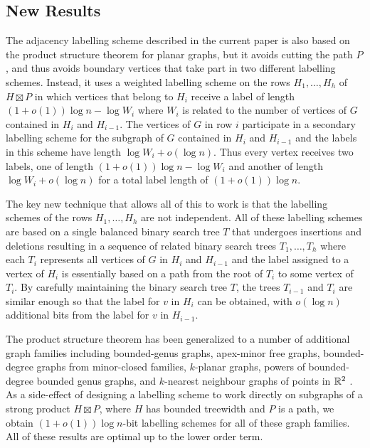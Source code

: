 \documentclass[kpfonts]{patmorin}
\begin{document}
\subsection{New Results}

The adjacency labelling scheme described in the current paper is also based on the product structure theorem for planar graphs, but it avoids cutting the path $P$, and thus avoids boundary vertices that take part in two different labelling schemes.  Instead, it uses a weighted labelling scheme on the rows $H_1,\dots,H_h$ of $H\boxtimes P$ in which vertices that belong to $H_i$ receive a label of length $(1+o(1))\log n-\log W_i$ where $W_i$ is related to the number of vertices of $G$ contained in $H_i$ and $H_{i-1}$.  The vertices of $G$ in row $i$ participate in a secondary labelling scheme for the subgraph of $G$ contained in $H_i$ and $H_{i-1}$ and the labels in this scheme have length $\log W_i + o(\log n)$. Thus every vertex receives two labels, one of length $(1+o(1))\log n-\log W_i$ and another of length $\log W_i + o(\log n)$ for a total label length of $(1+o(1))\log n$.

The key new technique that allows all of this to work is that the labelling schemes of the rows $H_1,\dots,H_h$ are not independent.  All of these labelling schemes are based on a single balanced binary search tree $T$ that undergoes insertions and deletions resulting in a sequence of related binary search trees $T_1,\dots,T_h$ where each $T_i$ represents all vertices of $G$ in $H_{i}$ and $H_{i-1}$ and the label assigned to a vertex of $H_i$ is essentially based on a path from the root of $T_i$ to some vertex of $T_i$.  By carefully maintaining the binary search tree $T$, the trees $T_{i-1}$ and $T_{i}$ are similar enough so that the label for $v$ in $H_i$ can be obtained, with $o(\log n)$ additional bits from the label for $v$ in $H_{i-1}$.

The product structure theorem has been generalized to a number of additional graph families including bounded-genus graphs, apex-minor free graphs, bounded-degree graphs from minor-closed families, $k$-planar graphs, powers of bounded-degree bounded genus graphs, and $k$-nearest neighbour graphs of points in $\mathbb{R}^2$ \cite{dujmovic.joret.ea:planar,dujmovic.morin.ea:structure}. As a side-effect of designing a labelling scheme to work directly on subgraphs of a strong product $H\boxtimes P$, where $H$ has bounded treewidth and $P$ is a path,
we obtain $(1+o(1))\log n$-bit labelling schemes for all of these graph families.  All of these results are optimal up to the lower order term.
\end{document}

